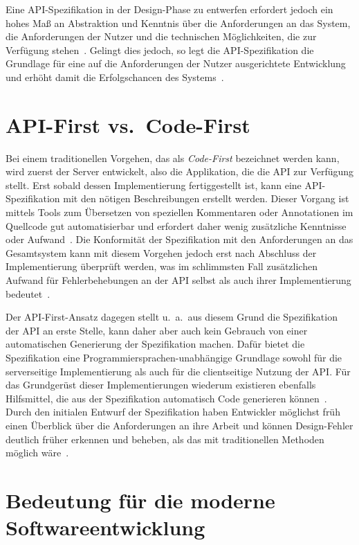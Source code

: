 Eine \ac{API}-Spezifikation in der Design-Phase zu entwerfen erfordert jedoch ein hohes Maß an Abstraktion und Kenntnis über die Anforderungen an das System, die Anforderungen der Nutzer und die technischen Möglichkeiten, die zur Verfügung stehen~\autocite[362]{de23}.
Gelingt dies jedoch, so legt die \ac{API}-Spezifikation die Grundlage für eine auf die Anforderungen der Nutzer ausgerichtete Entwicklung und erhöht damit die Erfolgschancen des Systems~\autocite[1627]{cha21}.

\section{API-First vs.\ Code-First}
Bei einem traditionellen Vorgehen, das als \emph{Code-First} bezeichnet werden kann, wird zuerst der Server entwickelt, also die Applikation, die die \ac{API} zur Verfügung stellt.
Erst sobald dessen Implementierung fertiggestellt ist, kann eine \ac{API}-Spezifikation mit den nötigen Beschreibungen erstellt werden.
Dieser Vorgang ist mittels Tools zum Übersetzen von speziellen Kommentaren oder Annotationen im Quellcode gut automatisierbar und erfordert daher wenig zusätzliche Kenntnisse oder Aufwand~\autocite{ope24}.
Die Konformität der Spezifikation mit den Anforderungen an das Gesamtsystem kann mit diesem Vorgehen jedoch erst nach Abschluss der Implementierung überprüft werden, was im schlimmsten Fall zusätzlichen Aufwand für Fehlerbehebungen an der \ac{API} selbst als auch ihrer Implementierung bedeutet~\autocite{vol22}.

Der API-First-Ansatz dagegen stellt u.\ a.\ aus diesem Grund die Spezifikation der \ac{API} an erste Stelle, kann daher aber auch kein Gebrauch von einer automatischen Generierung der Spezifikation machen.
Dafür bietet die Spezifikation eine Programmiersprachen-unabhängige Grundlage sowohl für die serverseitige Implementierung als auch für die clientseitige Nutzung der \ac{API}.
Für das Grundgerüst dieser Implementierungen wiederum existieren ebenfalls Hilfsmittel, die aus der Spezifikation automatisch Code generieren können~\autocite{ope24}.
Durch den initialen Entwurf der Spezifikation haben Entwickler möglichst früh einen Überblick über die Anforderungen an ihre Arbeit und können Design-Fehler deutlich früher erkennen und beheben, als das mit traditionellen Methoden möglich wäre~\autocite[1627]{cha21}.

\section{Bedeutung für die moderne Softwareentwicklung}
